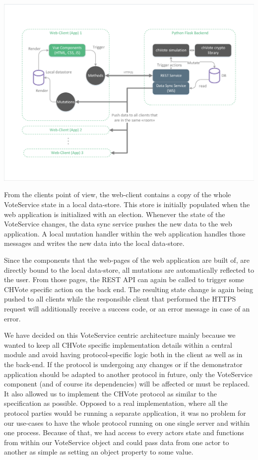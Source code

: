 \begin{center}
\includegraphics[scale=0.62]{assets/architecture.pdf}
\label{Architecture}%
\end{center}

From the clients point of view, the web-client contains a copy of the whole VoteService state in a local data-store. This store is initially populated when the web application is initialized with an election. Whenever the state of the VoteService changes, the data sync service pushes the new data to the web application. A local mutation handler within the web application handles those messages and writes the new data into the local data-store.

Since the components that the web-pages of the web application are built of, are directly bound to the local data-store, all mutations are automatically reflected to the user. From those pages, the REST API can again be called to trigger some CHVote specific action on the back end. The resulting state change is again being pushed to all clients while the responsible client that performed the HTTPS request will additionally receive a success code, or an error message in case of an error.

We have decided on this VoteService centric architecture mainly because we wanted to keep all CHVote specific implementation details within a central module and avoid having protocol-specific logic both in the client as well as in the back-end. If the protocol is undergoing any changes or if the demonstrator application should be adapted to another protocol in future, only the VoteService component (and of course its dependencies) will be affected or must be replaced. It also allowed us to implement the CHVote protocol as similar to the specification as possible. Opposed to a real implementation, where all the protocol parties would be running a separate application, it was no problem for our use-cases to have the whole protocol running on one single server and within one process. Because of that, we had access to every actors state and functions from within our VoteService object and could pass data from one actor to another as simple as setting an object property to some value. 
